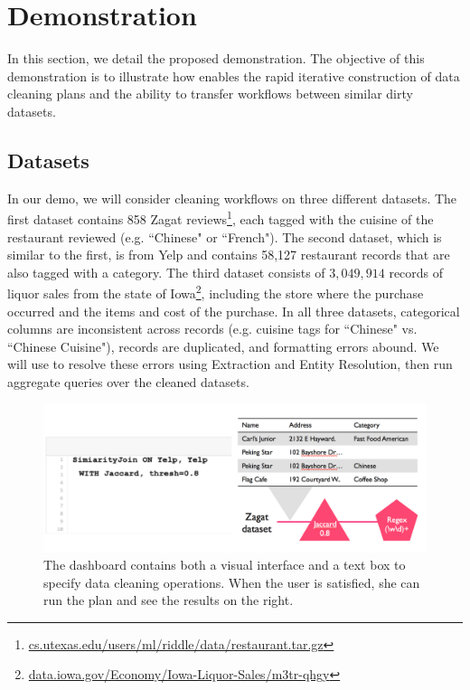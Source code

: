 \section{Demonstration}
In this section, we detail the proposed demonstration.
The objective of this demonstration is to illustrate 
how \sys enables the rapid iterative construction of data cleaning plans
and the ability to transfer workflows between similar dirty datasets.

\subsection{Datasets}
In our demo, we will consider cleaning workflows on three different datasets.
The first dataset contains 858 Zagat reviews\footnote{\scriptsize{ \url{cs.utexas.edu/users/ml/riddle/data/restaurant.tar.gz}}},
each tagged with the cuisine of the restaurant reviewed (e.g. ``Chinese" or ``French").
The second dataset, which is similar to the first, is from Yelp and contains 58,127 restaurant records that are also tagged with a category.
The third dataset consists of $3,049,914$ records of liquor sales from the state of Iowa\footnote{\scriptsize{\url{data.iowa.gov/Economy/Iowa-Liquor-Sales/m3tr-qhgy}}}, including the store where the purchase occurred and the items and cost of the purchase.
In all three datasets, categorical columns are inconsistent across records (e.g. cuisine tags for ``Chinese" vs. ``Chinese Cuisine"), records are duplicated, and formatting errors abound. 
We will use \sys to resolve these errors using Extraction and Entity Resolution, then run aggregate queries over the cleaned datasets.

\begin{figure}[t]
\centering
 \includegraphics[width=\columnwidth]{figs/dashboard_screenshot.png}
 \caption{The dashboard contains both a visual interface and a text box to specify data cleaning operations. When the user is satisfied, she can run the plan and see the results on the right. \label{screenshot}}
\end{figure}


